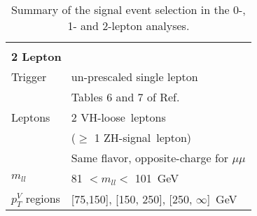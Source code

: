 \begin{table}[ht]
\begin{center}
\begin{tabular}{l l}
  &\\
\multicolumn{2}{l}{\textbf{2 Lepton}}\\
Trigger &  un-prescaled single lepton\\
        & Tables 6 and 7 of Ref.~\cite{VHobjectsupportnote}\\
Leptons & 2 VH-loose\ leptons \\
        & ($\ge$ 1 ZH-signal\ lepton) \\
        &  Same flavor, opposite-charge for $\mu\mu$ \\
$m_{ll}$   & 81 $< m_{ll} <$ 101~GeV \\
$p_T^{V}$ regions & [75,150], [150, 250], [250, $\infty$]~GeV  \\
\bottomrule

\end{tabular}
\caption{Summary of the signal event selection in the 0-, 1- and 2-lepton analyses.}
\label{tab:event-selection}
\end{center}
\end{table}